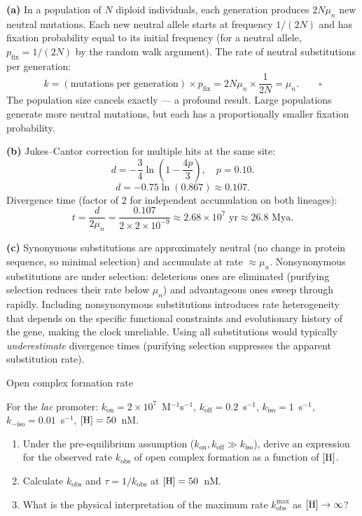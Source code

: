 \documentclass[12pt, a4paper, oneside]{report}
\begin{document}
\begin{solution}
  \textbf{(a)} In a population of $N$ diploid individuals, each generation
  produces $2N\mu_n$ new neutral mutations. Each new neutral allele starts
  at frequency $1/(2N)$ and has fixation probability equal to its initial
  frequency (for a neutral allele, $p_\text{fix} = 1/(2N)$ by the
  random walk argument). The rate of neutral substitutions per generation:
  \[
    k = (\text{mutations per generation}) \times p_\text{fix}
      = 2N\mu_n \times \frac{1}{2N} = \mu_n. \qquad\square
  \]
  The population size cancels exactly — a profound result. Large populations
  generate more neutral mutations, but each has a proportionally smaller
  fixation probability.

  \textbf{(b)} Jukes--Cantor correction for multiple hits at the same site:
  \[
    d = -\frac{3}{4}\ln\!\left(1 - \frac{4p}{3}\right), \quad p = 0.10.
  \]
  \[
    d = -0.75\ln(0.867) \approx 0.107.
  \]
  Divergence time (factor of 2 for independent accumulation on both lineages):
  \[
    t = \frac{d}{2\mu_n} = \frac{0.107}{2\times2\times10^{-9}}
      \approx 2.68\times10^7 \text{ yr} \approx 26.8 \text{ Mya.}
  \]

  \textbf{(c)} Synonymous substitutions are approximately neutral (no
  change in protein sequence, so minimal selection) and accumulate at
  rate $\approx\mu_n$. Nonsynonymous substitutions are under selection:
  deleterious ones are eliminated (purifying selection reduces their rate
  below $\mu_n$) and advantageous ones sweep through rapidly. Including
  nonsynonymous substitutions introduces rate heterogeneity that depends
  on the specific functional constraints and evolutionary history of
  the gene, making the clock unreliable. Using all substitutions would
  typically \emph{underestimate} divergence times (purifying selection
  suppresses the apparent substitution rate).
\end{solution}

\begin{problem}{\enspace{}\enspace Open complex formation rate}

  For the \textit{lac} promoter: $k_\text{on} = 2\times10^7$~M$^{-1}$s$^{-1}$,
  $k_\text{off} = 0.2$~s$^{-1}$, $k_\text{iso} = 1$~s$^{-1}$,
  $k_{-\text{iso}} = 0.01$~s$^{-1}$, $[\mathrm{H}] = 50$~nM.

  \begin{enumerate}
    \item Under the pre-equilibrium assumption
          ($k_\text{on}, k_\text{off} \gg k_\text{iso}$), derive an
          expression for the observed rate $k_\text{obs}$ of open
          complex formation as a function of $[\mathrm{H}]$.
    \item Calculate $k_\text{obs}$ and $\tau = 1/k_\text{obs}$ at
          $[\mathrm{H}] = 50$~nM.
    \item What is the physical interpretation of the maximum rate
          $k_\text{obs}^\text{max}$ as $[\mathrm{H}] \to \infty$?
  \end{enumerate}
\end{problem}
\end{document}

